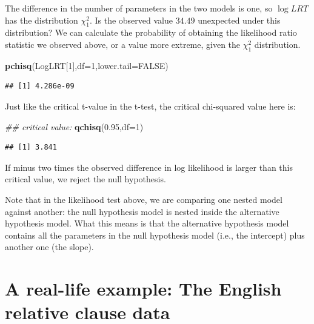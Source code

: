 \documentclass[12pt,]{krantz}
\newenvironment{Shaded}{\begin{snugshade}}{\end{snugshade}}
\newcommand{\CommentTok}[1]{\textcolor[rgb]{0.56,0.35,0.01}{\textit{#1}}}
\newcommand{\DataTypeTok}[1]{\textcolor[rgb]{0.13,0.29,0.53}{#1}}
\newcommand{\DecValTok}[1]{\textcolor[rgb]{0.00,0.00,0.81}{#1}}
\newcommand{\FloatTok}[1]{\textcolor[rgb]{0.00,0.00,0.81}{#1}}
\newcommand{\KeywordTok}[1]{\textcolor[rgb]{0.13,0.29,0.53}{\textbf{#1}}}
\newcommand{\NormalTok}[1]{#1}
\newcommand{\OtherTok}[1]{\textcolor[rgb]{0.56,0.35,0.01}{#1}}
\begin{document}
The difference in the number of parameters in the two models is one, so \(\log LRT\) has the distribution \(\chi_1^2\). Is the observed value \(34.49\) unexpected under this distribution? We can calculate the probability of obtaining the likelihood ratio statistic we observed above, or a value more extreme, given the \(\chi_1^2\) distribution.

\begin{Shaded}
\begin{Highlighting}[]
\KeywordTok{pchisq}\NormalTok{(LogLRT[}\DecValTok{1}\NormalTok{],}\DataTypeTok{df=}\DecValTok{1}\NormalTok{,}\DataTypeTok{lower.tail=}\OtherTok{FALSE}\NormalTok{)}
\end{Highlighting}
\end{Shaded}

\begin{verbatim}
## [1] 4.286e-09
\end{verbatim}

Just like the critical t-value in the t-test, the critical chi-squared value here is:

\begin{Shaded}
\begin{Highlighting}[]
\CommentTok{## critical value:}
\KeywordTok{qchisq}\NormalTok{(}\FloatTok{0.95}\NormalTok{,}\DataTypeTok{df=}\DecValTok{1}\NormalTok{)}
\end{Highlighting}
\end{Shaded}

\begin{verbatim}
## [1] 3.841
\end{verbatim}

If minus two times the observed difference in log likelihood is larger than this critical value, we reject the null hypothesis.

Note that in the likelihood test above, we are comparing one nested model against another: the null hypothesis model is nested inside the alternative hypothesis model. What this means is that the alternative hypothesis model contains all the parameters in the null hypothesis model (i.e., the intercept) plus another one (the slope).

\hypertarget{a-real-life-example-the-english-relative-clause-data}{%
\section{A real-life example: The English relative clause data}\label{a-real-life-example-the-english-relative-clause-data}}
\end{document}
